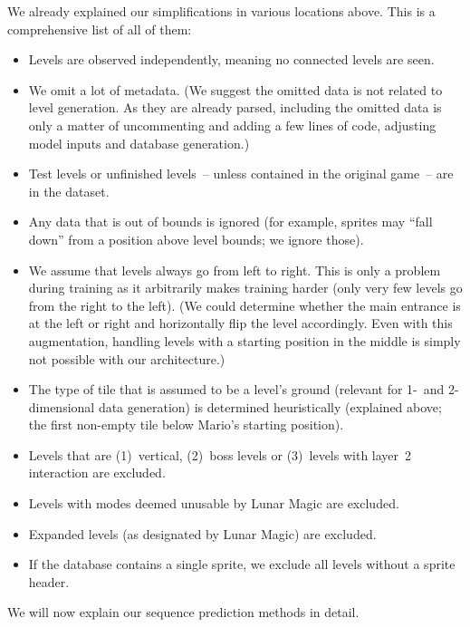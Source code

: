 We already explained our simplifications in various locations above.
This is a comprehensive list of all of them:
\begin{itemize}
\item Levels are observed independently, meaning no connected levels
  are seen.
\item We omit a lot of metadata. (We suggest the omitted data is not
  related to level generation. As they are already parsed, including
  the omitted data is only a matter of uncommenting and adding a few
  lines of code, adjusting model inputs and database generation.)
\item Test levels or unfinished levels~-- unless contained in the
  original game~-- are in the dataset.
\item Any data that is out of bounds is ignored (for example, sprites
  may ``fall down'' from a position above level bounds; we ignore
  those).
\item We assume that levels always go from left to right. This is only
  a problem during training as it arbitrarily makes training harder
  (only very few levels go from the right to the left). (We could
  determine whether the main entrance is at the left or right and
  horizontally flip the level accordingly. Even with this
  augmentation, handling levels with a starting position in the middle
  is simply not possible with our architecture.)
\item The type of tile that is assumed to be a level's ground
  (relevant for 1-~and 2-dimensional data generation) is determined
  heuristically (explained above; the first non-empty tile below
  Mario's starting position).
\item Levels that are (1)~vertical, (2)~boss levels or (3)~levels with
  layer~2 interaction are excluded.
\item Levels with modes deemed unusable by Lunar Magic are excluded.
\item Expanded levels (as designated by Lunar Magic) are excluded.
\item If the database contains a single sprite, we exclude all levels
  without a sprite header.
\end{itemize}

We will now explain our sequence prediction methods in detail.


